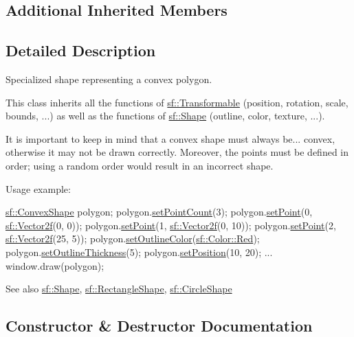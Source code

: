 \subsection*{Additional Inherited Members}


\subsection{Detailed Description}
Specialized shape representing a convex polygon. 

This class inherits all the functions of \hyperlink{classsf_1_1_transformable}{sf\+::\+Transformable} (position, rotation, scale, bounds, ...) as well as the functions of \hyperlink{classsf_1_1_shape}{sf\+::\+Shape} (outline, color, texture, ...).

It is important to keep in mind that a convex shape must always be... convex, otherwise it may not be drawn correctly. Moreover, the points must be defined in order; using a random order would result in an incorrect shape.

Usage example\+: 
\begin{DoxyCode}
\hyperlink{classsf_1_1_convex_shape}{sf::ConvexShape} polygon;
polygon.\hyperlink{classsf_1_1_convex_shape_a56e6e79ade6dd651cc1a0e39cb68deae}{setPointCount}(3);
polygon.\hyperlink{classsf_1_1_convex_shape_a5929e0ab0ba5ca1f102b40c234a8e92d}{setPoint}(0, \hyperlink{classsf_1_1_vector2}{sf::Vector2f}(0, 0));
polygon.\hyperlink{classsf_1_1_convex_shape_a5929e0ab0ba5ca1f102b40c234a8e92d}{setPoint}(1, \hyperlink{classsf_1_1_vector2}{sf::Vector2f}(0, 10));
polygon.\hyperlink{classsf_1_1_convex_shape_a5929e0ab0ba5ca1f102b40c234a8e92d}{setPoint}(2, \hyperlink{classsf_1_1_vector2}{sf::Vector2f}(25, 5));
polygon.\hyperlink{classsf_1_1_shape_a5978f41ee349ac3c52942996dcb184f7}{setOutlineColor}(\hyperlink{classsf_1_1_color_a127dbf55db9c07d0fa8f4bfcbb97594a}{sf::Color::Red});
polygon.\hyperlink{classsf_1_1_shape_a5ad336ad74fc1f567fce3b7e44cf87dc}{setOutlineThickness}(5);
polygon.\hyperlink{classsf_1_1_transformable_a4dbfb1a7c80688b0b4c477d706550208}{setPosition}(10, 20);
...
window.draw(polygon);
\end{DoxyCode}


\begin{DoxySeeAlso}{See also}
\hyperlink{classsf_1_1_shape}{sf\+::\+Shape}, \hyperlink{classsf_1_1_rectangle_shape}{sf\+::\+Rectangle\+Shape}, \hyperlink{classsf_1_1_circle_shape}{sf\+::\+Circle\+Shape} 
\end{DoxySeeAlso}


\subsection{Constructor \& Destructor Documentation}
\mbox{\label{classsf_1_1_convex_shape_af9981b8909569b381b3fccf32fc69856}} 
